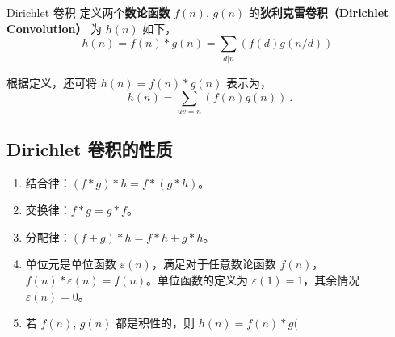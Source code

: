 
\begin{definition}{Dirichlet 卷积}
定义两个\textbf{数论函数} $f(n)$, $g(n)$ 的\textbf{狄利克雷卷积（Dirichlet Convolution）} 为 $h(n)$ 如下，
\begin{equation}
h(n) = f(n) * g(n) = \sum_{d|n}\left(f(d) g(n/d)\right) ~~
\end{equation}
\end{definition}
根据定义，还可将 $h(n) = f(n) * g(n)$ 表示为，
\begin{equation}
h(n) = \sum_{uv = n} (f(n) g(n)) ~.
\end{equation}

\subsection{Dirichlet 卷积的性质}
\begin{enumerate}
\item 结合律：$(f*g)*h = f*(g*h)$。
\item 交换律：$f*g = g*f$。
\item 分配律：$(f+g)*h = f*h + g*h$。
\item 单位元是单位函数 $\varepsilon(n)$，满足对于任意数论函数 $f(n)$，$f(n)*\varepsilon(n) = f(n)$。单位函数的定义为 $\varepsilon(1)=1$，其余情况 $\varepsilon(n) = 0$。
\item 若 $f(n)$, $g(n)$ 都是积性的，则 $h(n) = f(n)*g($
\end{enumerate}
